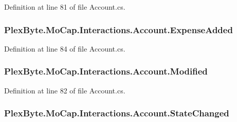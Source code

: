 Definition at line 81 of file Account.\+cs.

\subsubsection[{\texorpdfstring{Expense\+Added}{ExpenseAdded}}]{ Plex\+Byte.\+Mo\+Cap.\+Interactions.\+Account.\+Expense\+Added}\hypertarget{class_plex_byte_1_1_mo_cap_1_1_interactions_1_1_account_ad96bd65da3c69c282a266761593c7cd7}{}\label{class_plex_byte_1_1_mo_cap_1_1_interactions_1_1_account_ad96bd65da3c69c282a266761593c7cd7}


Definition at line 84 of file Account.\+cs.

\subsubsection[{\texorpdfstring{Modified}{Modified}}]{ Plex\+Byte.\+Mo\+Cap.\+Interactions.\+Account.\+Modified}\hypertarget{class_plex_byte_1_1_mo_cap_1_1_interactions_1_1_account_a79a653b390e022a26200899b77c276cf}{}\label{class_plex_byte_1_1_mo_cap_1_1_interactions_1_1_account_a79a653b390e022a26200899b77c276cf}


Definition at line 82 of file Account.\+cs.

\subsubsection[{\texorpdfstring{State\+Changed}{StateChanged}}]{ Plex\+Byte.\+Mo\+Cap.\+Interactions.\+Account.\+State\+Changed}\hypertarget{class_plex_byte_1_1_mo_cap_1_1_interactions_1_1_account_a0a0a49e58be6492cce544f8a6009dc52}{}\label{class_plex_byte_1_1_mo_cap_1_1_interactions_1_1_account_a0a0a49e58be6492cce544f8a6009dc52}


